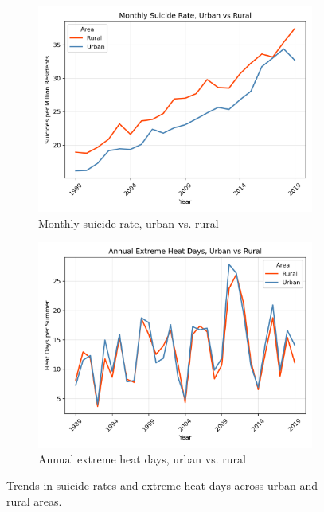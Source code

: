 \documentclass[12pt, a4paper]{article}
\begin{document}
\begin{figure}[H]
    \centering
    \begin{subfigure}[b]{0.48\textwidth}
        \includegraphics[width=\textwidth]{Monthly Suicide Rate.png}
        \caption{Monthly suicide rate, urban vs. rural}
        \label{fig:suicide}
    \end{subfigure}
    \hfill
    \begin{subfigure}[b]{0.48\textwidth}
        \includegraphics[width=\textwidth]{EHDs.png}
        \caption{Annual extreme heat days, urban vs. rural}
        \label{fig:ehds}
    \end{subfigure}
    
    \caption{Trends in suicide rates and extreme heat days across urban and rural areas.}
    \label{fig:trends}
\end{figure}
\end{document}
